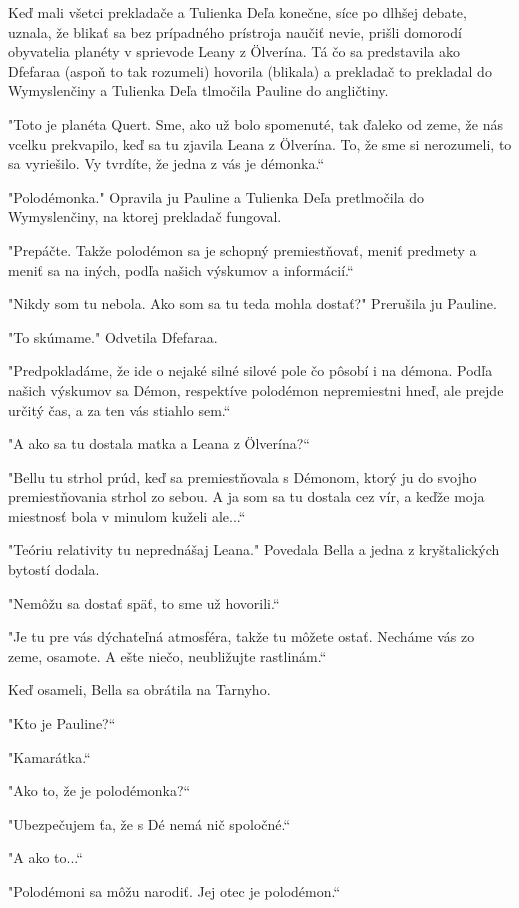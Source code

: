 \documentclass{book}
\begin{document}
Keď mali všetci prekladače a Tulienka Deľa konečne, síce po dlhšej debate, uznala, že blikať sa bez prípadného prístroja naučiť nevie, prišli domorodí obyvatelia planéty v sprievode Leany z Ölverína. Tá čo sa predstavila ako Dfefaraa (aspoň to tak rozumeli) hovorila (blikala) a prekladač to prekladal do Wymyslenčiny a Tulienka Deľa tlmočila Pauline do angličtiny.

"$ $Toto je planéta Quert. Sme, ako už bolo spomenuté, tak ďaleko od zeme, že nás vcelku prekvapilo, keď sa tu zjavila Leana z Ölverína. To, že sme si nerozumeli, to sa vyriešilo. Vy tvrdíte, že jedna z vás je démonka.“

"$ $Polodémonka."$ $ Opravila ju Pauline a Tulienka Deľa pretlmočila do Wymyslenčiny, na ktorej prekladač fungoval.

"$ $Prepáčte. Takže polodémon sa je schopný premiestňovať, meniť predmety a meniť sa na iných, podľa našich výskumov a informácií.“

"$ $Nikdy som tu nebola. Ako som sa tu teda mohla dostať?"$ $ Prerušila ju Pauline.

"$ $To skúmame."$ $ Odvetila Dfefaraa.

"$ $Predpokladáme, že ide o nejaké silné silové pole čo pôsobí i na démona. Podľa našich výskumov sa Démon, respektíve polodémon nepremiestni hneď, ale prejde určitý čas, a za ten vás stiahlo sem.“

"$ $A ako sa tu dostala matka a Leana z Ölverína?“

"$ $Bellu tu strhol prúd, keď sa premiestňovala s Démonom, ktorý ju do svojho premiestňovania strhol zo sebou. A ja som sa tu dostala cez vír, a keďže moja miestnosť bola v minulom kuželi ale...“

"$ $Teóriu relativity tu neprednášaj Leana."$ $ Povedala Bella a jedna z kryštalických bytostí dodala.

"$ $Nemôžu sa dostať späť, to sme už hovorili.“

"$ $Je tu pre vás dýchateľná atmosféra, takže tu môžete ostať. Necháme vás zo zeme, osamote. A ešte niečo, neubližujte rastlinám.“

Keď osameli, Bella sa obrátila na Tarnyho.

"$ $Kto je Pauline?“

"$ $Kamarátka.“

"$ $Ako to, že je polodémonka?“

"$ $Ubezpečujem ťa, že s Dé nemá nič spoločné.“

"$ $A ako to...“

"$ $Polodémoni sa môžu narodiť. Jej otec je polodémon.“
\end{document}

